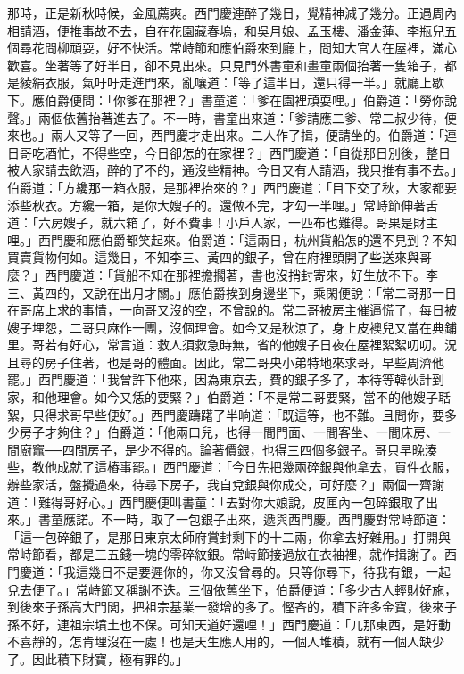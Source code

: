 那時，正是新秋時候，金風薦爽。西門慶連醉了幾日，覺精神減了幾分。正遇周內相請酒，便推事故不去，自在花園藏春塢，和吳月娘、孟玉樓、潘金蓮、李瓶兒五個尋花問柳頑耍，好不快活。常峙節和應伯爵來到廳上，問知大官人在屋裡，滿心歡喜。坐著等了好半日，卻不見出來。只見門外書童和畫童兩個抬著一隻箱子，都是綾絹衣服，氣吁吁走進門來，亂嚷道：「等了這半日，還只得一半。」就廳上歇下。應伯爵便問：「你爹在那裡？」書童道：「爹在園裡頑耍哩。」伯爵道：「勞你說聲。」兩個依舊抬著進去了。不一時，書童出來道：「爹請應二爹、常二叔少待，便來也。」兩人又等了一回，西門慶才走出來。二人作了揖，便請坐的。伯爵道：「連日哥吃酒忙，不得些空，今日卻怎的在家裡？」西門慶道：「自從那日別後，整日被人家請去飲酒，醉的了不的，通沒些精神。今日又有人請酒，我只推有事不去。」伯爵道：「方纔那一箱衣服，是那裡抬來的？」西門慶道：「目下交了秋，大家都要添些秋衣。方纔一箱，是你大嫂子的。還做不完，才勾一半哩。」常峙節伸著舌道：「六房嫂子，就六箱了，好不費事！小戶人家，一匹布也難得。哥果是財主哩。」西門慶和應伯爵都笑起來。伯爵道：「這兩日，杭州貨船怎的還不見到？不知買賣貨物何如。這幾日，不知李三、黃四的銀子，曾在府裡頭開了些送來與哥麼？」西門慶道：「貨船不知在那裡擔擱著，書也沒捎封寄來，好生放不下。李三、黃四的，又說在出月才關。」應伯爵挨到身邊坐下，乘閑便說：「常二哥那一日在哥席上求的事情，一向哥又沒的空，不曾說的。常二哥被房主催逼慌了，每日被嫂子埋怨，二哥只麻作一團，沒個理會。如今又是秋涼了，身上皮襖兒又當在典鋪里。哥若有好心，常言道：救人須救急時無，省的他嫂子日夜在屋裡絮絮叨叨。況且尋的房子住著，也是哥的體面。因此，常二哥央小弟特地來求哥，早些周濟他罷。」西門慶道：「我曾許下他來，因為東京去，費的銀子多了，本待等韓伙計到家，和他理會。如今又恁的要緊？」伯爵道：「不是常二哥要緊，當不的他嫂子聒絮，只得求哥早些便好。」西門慶躊躇了半晌道：「既這等，也不難。且問你，要多少房子才夠住？」伯爵道：「他兩口兒，也得一間門面、一間客坐、一間床房、一間廚竈──四間房子，是少不得的。論著價銀，也得三四個多銀子。哥只早晚湊些，教他成就了這樁事罷。」西門慶道：「今日先把幾兩碎銀與他拿去，買件衣服，辦些家活，盤攪過來，待尋下房子，我自兌銀與你成交，可好麼？」兩個一齊謝道：「難得哥好心。」西門慶便叫書童：「去對你大娘說，皮匣內一包碎銀取了出來。」書童應諾。不一時，取了一包銀子出來，遞與西門慶。西門慶對常峙節道：「這一包碎銀子，是那日東京太師府賞封剩下的十二兩，你拿去好雜用。」打開與常峙節看，都是三五錢一塊的零碎紋銀。常峙節接過放在衣袖裡，就作揖謝了。西門慶道：「我這幾日不是要遲你的，你又沒曾尋的。只等你尋下，待我有銀，一起兌去便了。」常峙節又稱謝不迭。三個依舊坐下，伯爵便道：「多少古人輕財好施，到後來子孫高大門閭，把祖宗基業一發增的多了。慳吝的，積下許多金寶，後來子孫不好，連祖宗墳土也不保。可知天道好還哩！」西門慶道：「兀那東西，是好動不喜靜的，怎肯埋沒在一處！也是天生應人用的，一個人堆積，就有一個人缺少了。因此積下財寶，極有罪的。」

